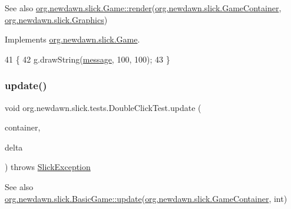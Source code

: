 \begin{DoxySeeAlso}{See also}
\mbox{\hyperlink{interfaceorg_1_1newdawn_1_1slick_1_1_game_af1a4670d43eb3ba04dfcf55ab1975b64}{org.\+newdawn.\+slick.\+Game\+::render}}(\mbox{\hyperlink{classorg_1_1newdawn_1_1slick_1_1_game_container}{org.\+newdawn.\+slick.\+Game\+Container}}, \mbox{\hyperlink{classorg_1_1newdawn_1_1slick_1_1_graphics}{org.\+newdawn.\+slick.\+Graphics}}) 
\end{DoxySeeAlso}


Implements \mbox{\hyperlink{interfaceorg_1_1newdawn_1_1slick_1_1_game_af1a4670d43eb3ba04dfcf55ab1975b64}{org.\+newdawn.\+slick.\+Game}}.


\begin{DoxyCode}
41                                                                                   \{
42         g.drawString(\mbox{\hyperlink{classorg_1_1newdawn_1_1slick_1_1tests_1_1_double_click_test_ab7f5f424e09fe1617e6d75e1cafb057e}{message}}, 100, 100);
43     \}
\end{DoxyCode}
\mbox{\label{classorg_1_1newdawn_1_1slick_1_1tests_1_1_double_click_test_a56eac0e1f8180ecabcd3ccb9d6b45b71}} 
\subsubsection{\texorpdfstring{update()}{update()}}
{\footnotesize\ttfamily void org.\+newdawn.\+slick.\+tests.\+Double\+Click\+Test.\+update (\begin{DoxyParamCaption}\item[{\mbox{\hyperlink{classorg_1_1newdawn_1_1slick_1_1_game_container}{Game\+Container}}}]{container,  }\item[{int}]{delta }\end{DoxyParamCaption}) throws \mbox{\hyperlink{classorg_1_1newdawn_1_1slick_1_1_slick_exception}{Slick\+Exception}}\hspace{0.3cm}{\ttfamily [inline]}}

\begin{DoxySeeAlso}{See also}
\mbox{\hyperlink{classorg_1_1newdawn_1_1slick_1_1_basic_game_acfe6fa05aef83bff1631af91a3e4bd20}{org.\+newdawn.\+slick.\+Basic\+Game\+::update}}(\mbox{\hyperlink{classorg_1_1newdawn_1_1slick_1_1_game_container}{org.\+newdawn.\+slick.\+Game\+Container}}, int) 
\end{DoxySeeAlso}


